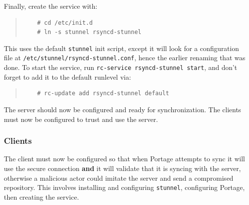 \documentclass{article}
\begin{document}
Finally, create the service with:
\begin{quote}
\begin{verbatim}
	# cd /etc/init.d
	# ln -s stunnel rsyncd-stunnel
\end{verbatim}
\end{quote}
This uses the default \texttt{stunnel} init script, except it will look for a configuration file at \texttt{/etc/stunnel/rsyncd-stunnel.conf}, hence the earlier renaming that was done.  To start the service, run \texttt{rc-service rsyncd-stunnel start}, and don't forget to add it to the default runlevel via:
\begin{quote}
\begin{verbatim}
	# rc-update add rsyncd-stunnel default
\end{verbatim}
\end{quote}

The server should now be configured and ready for synchronization.  The clients must now be configured to trust and use the server.

\subsubsection{Clients}
The client must now be configured so that when Portage attempts to sync it will use the secure connection \textbf{and} it will validate that it is syncing with the server, otherwise a malicious actor could imitate the server and send a compromised repository.  This involves installing and configuring \texttt{stunnel}, configuring Portage, then creating the service.
\end{document}
